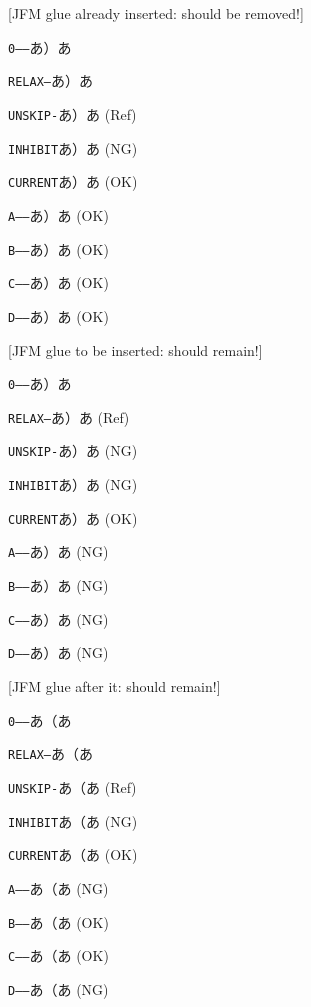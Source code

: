\documentclass{article}
\begin{document}
\def\SHOWNODE{}%
\def\TT#1{\texttt{#1}\null}

[JFM glue already inserted: should be removed!]\par
\TT{0------}あ）\relax\SHOWNODE                 あ\par
\TT{RELAX--}あ）\relax\relax          \SHOWNODE あ\par
\TT{UNSKIP-}あ）\relax\unskip         \SHOWNODE あ (Ref)\par
\TT{INHIBIT}あ）\relax\inhibitglue    \SHOWNODE あ (NG)\par
\TT{CURRENT}あ）\relax\removejfmglue  \SHOWNODE あ (OK)\par
\TT{A------}あ）\relax\removejfmglueA \SHOWNODE あ (OK)\par
\TT{B------}あ）\relax\removejfmglueB \SHOWNODE あ (OK)\par
\TT{C------}あ）\relax\removejfmglueC \SHOWNODE あ (OK)\par
\TT{D------}あ）\relax\removejfmglueD \SHOWNODE あ (OK)\par

[JFM glue to be inserted: should remain!]\par
\TT{0------}あ）\SHOWNODE                 あ\par
\TT{RELAX--}あ）\relax          \SHOWNODE あ (Ref)\par
\TT{UNSKIP-}あ）\unskip         \SHOWNODE あ (NG)\par
\TT{INHIBIT}あ）\inhibitglue    \SHOWNODE あ (NG)\par
\TT{CURRENT}あ）\removejfmglue  \SHOWNODE あ (OK)\par
\TT{A------}あ）\removejfmglueA \SHOWNODE あ (NG)\par
\TT{B------}あ）\removejfmglueB \SHOWNODE あ (NG)\par
\TT{C------}あ）\removejfmglueC \SHOWNODE あ (NG)\par
\TT{D------}あ）\removejfmglueD \SHOWNODE あ (NG)\par

[JFM glue after it: should remain!]\par
\TT{0------}あ\SHOWNODE                 （あ\par
\TT{RELAX--}あ\relax          \SHOWNODE （あ\par
\TT{UNSKIP-}あ\unskip         \SHOWNODE （あ (Ref)\par
\TT{INHIBIT}あ\inhibitglue    \SHOWNODE （あ (NG)\par
\TT{CURRENT}あ\removejfmglue  \SHOWNODE （あ (OK)\par
\TT{A------}あ\removejfmglueA \SHOWNODE （あ (NG)\par
\TT{B------}あ\removejfmglueB \SHOWNODE （あ (OK)\par
\TT{C------}あ\removejfmglueC \SHOWNODE （あ (OK)\par
\TT{D------}あ\removejfmglueD \SHOWNODE （あ (NG)\par
\end{document}
